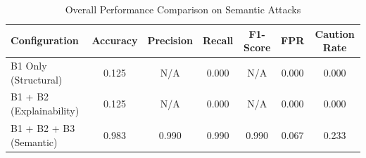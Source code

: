 \begin{table}[h]
\centering
\caption{Overall Performance Comparison on Semantic Attacks}
\label{tab:semantic_results}
\begin{tabular}{lcccccc}
\hline
\textbf{Configuration} & \textbf{Accuracy} & \textbf{Precision} & \textbf{Recall} & \textbf{F1-Score} & \textbf{FPR} & \textbf{Caution Rate} \\ \hline
B1 Only (Structural) & 0.125 & N/A & 0.000 & N/A & 0.000 & 0.000 \\
B1 + B2 (Explainability) & 0.125 & N/A & 0.000 & N/A & 0.000 & 0.000 \\
B1 + B2 + B3 (Semantic) & 0.983 & 0.990 & 0.990 & 0.990 & 0.067 & 0.233 \\
\hline
\end{tabular}
\end{table}
